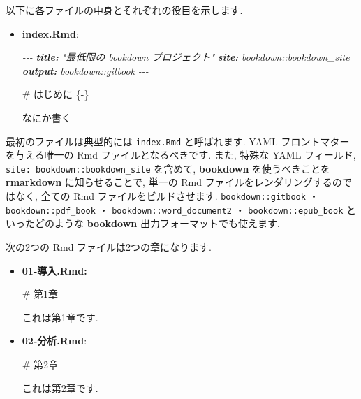 \documentclass[
  11pt,
  lualatex,ja=standard,jafont=noto]{bxjsreport}
\newenvironment{Shaded}{\begin{snugshade}}{\end{snugshade}}
\newcommand{\AnnotationTok}[1]{\textcolor[rgb]{0.56,0.35,0.01}{\textbf{\textit{#1}}}}
\newcommand{\CommentTok}[1]{\textcolor[rgb]{0.56,0.35,0.01}{\textit{#1}}}
\newcommand{\FunctionTok}[1]{\textcolor[rgb]{0.00,0.00,0.00}{#1}}
\newcommand{\NormalTok}[1]{#1}
\begin{document}
以下に各ファイルの中身とそれぞれの役目を示します.

\begin{itemize}
\item
  \textbf{index.Rmd}:

\begin{Shaded}
\begin{Highlighting}[]
\CommentTok{{-}{-}{-}}
\AnnotationTok{title:}\CommentTok{ "最低限の bookdown プロジェクト"}
\AnnotationTok{site:}\CommentTok{ bookdown::bookdown\_site}
\AnnotationTok{output:}\CommentTok{ bookdown::gitbook}
\CommentTok{{-}{-}{-}}

\FunctionTok{\# はじめに \{{-}\}}

\NormalTok{なにか書く}
\end{Highlighting}
\end{Shaded}
\end{itemize}

最初のファイルは典型的には \texttt{index.Rmd} と呼ばれます. YAML フロントマターを与える唯一の Rmd ファイルとなるべきです. また, 特殊な YAML フィールド, \texttt{site: bookdown::bookdown\_site} を含めて, \textbf{bookdown} を使うべきことを \textbf{rmarkdown} に知らせることで, 単一の Rmd ファイルをレンダリングするのではなく, 全ての Rmd ファイルをビルドさせます. \texttt{bookdown::gitbook} ・ \texttt{bookdown::pdf\_book} ・ \texttt{bookdown::word\_document2} ・ \texttt{bookdown::epub\_book} といったどのような \textbf{bookdown} 出力フォーマットでも使えます.

次の2つの Rmd ファイルは2つの章になります.

\begin{itemize}
\item
  \textbf{01-導入.Rmd:}

\begin{Shaded}
\begin{Highlighting}[]
\FunctionTok{\# 第1章}

\NormalTok{これは第1章です.}
\end{Highlighting}
\end{Shaded}
\item
  \textbf{02-分析.Rmd}:

\begin{Shaded}
\begin{Highlighting}[]
\FunctionTok{\# 第2章}

\NormalTok{これは第2章です.}
\end{Highlighting}
\end{Shaded}
\end{itemize}
\end{document}
